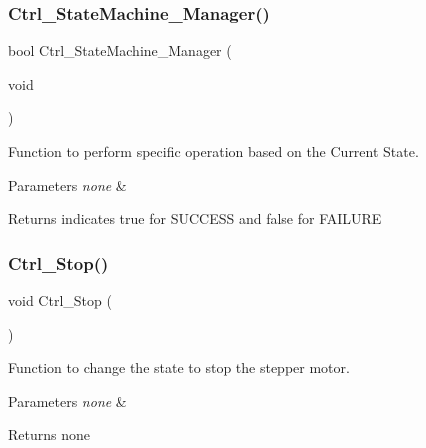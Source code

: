 \subsubsection{\texorpdfstring{Ctrl\+\_\+\+State\+Machine\+\_\+\+Manager()}{Ctrl\_StateMachine\_Manager()}}
{\footnotesize\ttfamily bool Ctrl\+\_\+\+State\+Machine\+\_\+\+Manager (\begin{DoxyParamCaption}\item[{void}]{ }\end{DoxyParamCaption})}



Function to perform specific operation based on the Current State. 


\begin{DoxyParams}{Parameters}
{\em none} & \\
\hline
\end{DoxyParams}
\begin{DoxyReturn}{Returns}
indicates true for S\+U\+C\+C\+E\+SS and false for F\+A\+I\+L\+U\+RE 
\end{DoxyReturn}
\mbox{\label{group___state_control_module_ga9893b8ac36b61c5804fe404e9bfa1163}} 
\subsubsection{\texorpdfstring{Ctrl\+\_\+\+Stop()}{Ctrl\_Stop()}}
{\footnotesize\ttfamily void Ctrl\+\_\+\+Stop (\begin{DoxyParamCaption}{ }\end{DoxyParamCaption})}



Function to change the state to stop the stepper motor. 


\begin{DoxyParams}{Parameters}
{\em none} & \\
\hline
\end{DoxyParams}
\begin{DoxyReturn}{Returns}
none 
\end{DoxyReturn}
\mbox{\label{group___state_control_module_ga6591c14e3084f61ee1e51057d2baa269}} 
